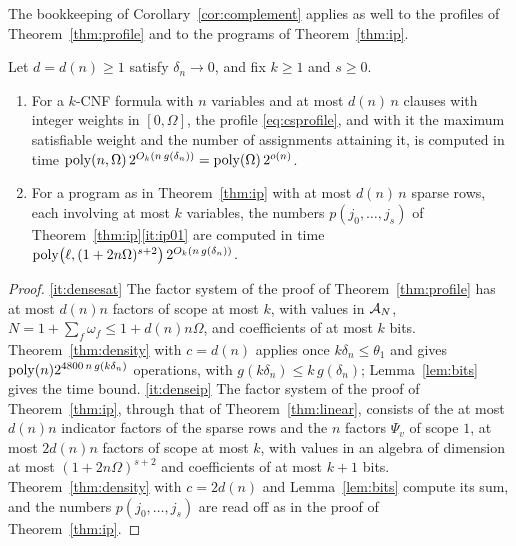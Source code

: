 The bookkeeping of Corollary~\ref{cor:complement} applies as well to the profiles of Theorem~\ref{thm:profile} and
to the programs of Theorem~\ref{thm:ip}.

\begin{corollary}\label{cor:densitysat}
Let $d=d(n)\ge1$ satisfy $\delta_n\to0$, and fix $k\ge1$ and $s\ge0$.
\begin{enumerate}[label=(\roman*),leftmargin=2.2em]
\item\label{it:densesat} For a $k$-CNF formula with $n$ variables and at most
$d(n)\,n$ clauses with integer weights in $[0,\Omega]$, the profile
\eqref{eq:csprofile}, and with it the maximum satisfiable weight and the
number of assignments attaining it, is computed in time
$\operatorname{poly}(n,\Omega)\,2^{O_k(n\,g(\delta_n))}=\operatorname{poly}(\Omega)\,2^{o(n)}$.
\item\label{it:denseip} For a program as in Theorem~\ref{thm:ip} with at most
$d(n)\,n$ sparse rows, each involving at most $k$ variables, the numbers
$p(j_0,\dots,j_s)$ of Theorem~\ref{thm:ip}\ref{it:ip01} are computed in time
$\operatorname{poly}\bigl(\ell,(1+2n\Omega)^{s+2}\bigr)\,2^{O_{k}(n\,g(\delta_n))}$.
\end{enumerate}
\end{corollary}

\begin{proof}
\ref{it:densesat} The factor system of the proof of Theorem~\ref{thm:profile}
has at most $d(n)n$ factors of scope at most $k$, with values in $\mathcal{A}_N$,
$N=1+\sum_f\omega_f\le1+d(n)n\Omega$, and coefficients of at most $k$ bits.
Theorem~\ref{thm:density} with $c=d(n)$ applies once $k\delta_n\le\theta_1$ and gives
$\operatorname{poly}(n)2^{4800\,n\,g(k\delta_n)}$ operations, with $g(k\delta_n)\le k\,g(\delta_n)$;
Lemma~\ref{lem:bits} gives the time bound.
\ref{it:denseip} The factor system of the proof of Theorem~\ref{thm:ip}, through
that of Theorem~\ref{thm:linear}, consists of the at most $d(n)n$ indicator
factors of the sparse rows and the $n$ factors $\Psi_v$ of scope $1$, at most
$2d(n)n$ factors of scope at most $k$, with values in an algebra of dimension
at most $(1+2n\Omega)^{s+2}$ and coefficients of at most $k+1$ bits.
Theorem~\ref{thm:density} with $c=2d(n)$ and Lemma~\ref{lem:bits} compute its
sum, and the numbers $p(j_0,\dots,j_s)$ are read off as in the proof of
Theorem~\ref{thm:ip}.
\end{proof}

